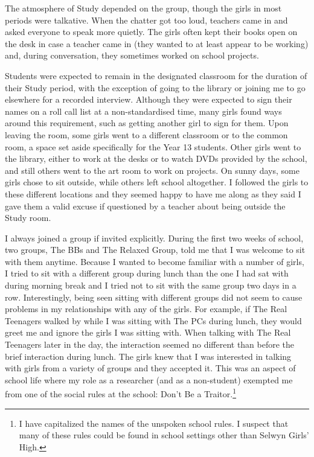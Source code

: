 The atmosphere of Study depended on the group, though the girls in most periods were talkative. When the chatter got too loud, teachers came in and asked everyone to speak more quietly. The girls often kept their books open on the desk in case a teacher came in (they wanted to at least appear to be working) and, during conversation, they sometimes worked on school projects.

Students were expected to remain in the designated classroom for the duration of their Study period, with the exception of going to the library or joining me to go elsewhere for a recorded interview. Although they were expected to sign their names on a roll call list at a non-standardised time, many girls found ways around this requirement, such as getting another girl to sign for them. Upon leaving the room, some girls went to a different classroom or to the common room, a space set aside specifically for the Year 13 students. Other girls went to the library, either to work at the desks or to watch DVDs provided by the school, and still others went to the art room to work on projects. On sunny days, some girls chose to sit outside, while others left school altogether. I followed the girls to these different locations and they seemed happy to have me along as they said I gave them a valid excuse if questioned by a teacher about being outside the Study room.


I always joined a group if invited explicitly. During the first two weeks of school, two groups, The BBs and The Relaxed Group, told me that I was welcome to sit with them anytime. Because I wanted to become familiar with a number of girls, I tried to sit with a different group during lunch than the one I had sat with during morning break and I tried not to sit with the same group two days in a row. Interestingly, being seen sitting with different groups did not seem to cause problems in my relationships with any of the girls. For example, if The Real Teenagers walked by while I was sitting with The PCs during lunch, they would greet me and ignore the girls I was sitting with. When talking with The Real Teenagers later in the day, the interaction seemed no different than before the brief interaction during lunch. The girls knew that I was interested in talking with girls from a variety of groups and they accepted it. This was an aspect of school life where my role as a researcher (and as a non-student) exempted me from one of the social rules at the school: Don't Be a Traitor.\footnote{I have capitalized the names of the unspoken school rules. I suspect that many of these rules could be found in school settings other than Selwyn Girls' High.}


